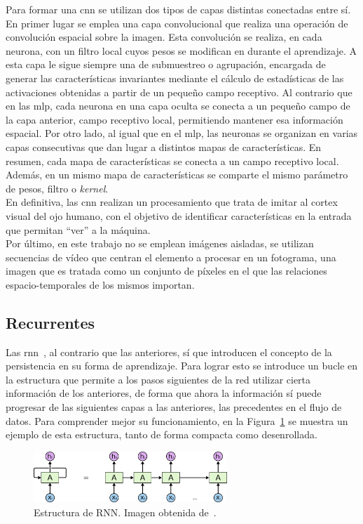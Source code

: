 Para formar una \acrshort{cnn} se utilizan dos tipos de capas distintas conectadas entre sí. En primer lugar se emplea una capa convolucional que realiza una operación de convolución espacial sobre la imagen. Esta convolución se realiza, en cada neurona, con un filtro local cuyos pesos se modifican en durante el aprendizaje. A esta capa le sigue siempre una de submuestreo o agrupación, encargada de generar las características invariantes mediante el cálculo de estadísticas de las activaciones obtenidas a partir de un pequeño campo receptivo. Al contrario que en las \acrshort{mlp}, cada neurona en una capa oculta se conecta a un pequeño campo de la capa anterior, campo receptivo local, permitiendo mantener esa información espacial. Por otro lado, al igual que en el \acrshort{mlp}, las neuronas se organizan en varias capas consecutivas que dan lugar a distintos mapas de características. En resumen, cada mapa de características se conecta a un campo receptivo local. Además, en un mismo mapa de características se comparte el mismo parámetro de pesos, filtro o \textit{kernel}.\\

En definitiva, las \acrshort{cnn} realizan un procesamiento que trata de imitar al cortex visual del ojo humano, con el objetivo de identificar características en la entrada que permitan ``ver'' a la máquina.\\

Por último, en este trabajo no se emplean imágenes aisladas, se utilizan secuencias de vídeo que centran el elemento a procesar en un fotograma, una imagen que es tratada como un conjunto de píxeles en el que las relaciones espacio-temporales de los mismos importan.

\subsection{Recurrentes}
Las \acrfull{rnn}~\cite{lstm}, al contrario que las anteriores, sí que introducen el concepto de la persistencia en su forma de aprendizaje. Para lograr esto se introduce un bucle en la estructura que permite a los pasos siguientes de la red utilizar cierta información de los anteriores, de forma que ahora la información sí puede progresar de las siguientes capas a las anteriores, las precedentes en el flujo de datos. Para comprender mejor su funcionamiento, en la Figura~\ref{fig.rnn} se muestra un ejemplo de esta estructura, tanto de forma compacta como desenrollada.
\vspace{10pt}
\begin{figure}[H]
	\begin{center}
		\includegraphics[width=0.65\textwidth]{ figures/intro/rnn.png}
		\caption{Estructura de RNN. Imagen obtenida de~\cite{lstm}.
		}
		\label{fig.rnn}
	\end{center}
\end{figure}
\vspace{-10pt}

